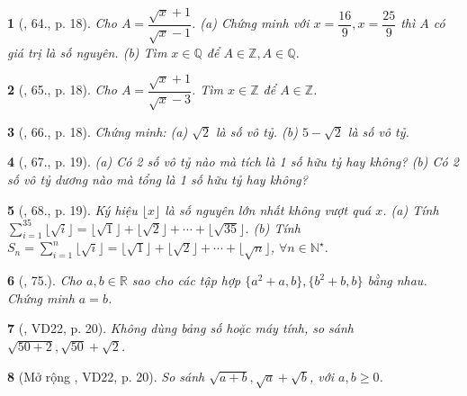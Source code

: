 \documentclass{article}
\newtheorem{baitoan}{}
\begin{document}
\begin{baitoan}[\cite{Binh_Toan_7_tap_1}, 64., p. 18]
	Cho $A = \dfrac{\sqrt{x} + 1}{\sqrt{x} - 1}$. (a) Chứng minh với $x = \dfrac{16}{9},x = \dfrac{25}{9}$ thì $A$ có giá trị là số nguyên. (b) Tìm $x\in\mathbb{Q}$ để $A\in\mathbb{Z},A\in\mathbb{Q}$.
\end{baitoan}

\begin{baitoan}[\cite{Binh_Toan_7_tap_1}, 65., p. 18]
	Cho $A = \dfrac{\sqrt{x} + 1}{\sqrt{x} - 3}$. Tìm $x\in\mathbb{Z}$ để $A\in\mathbb{Z}$.
\end{baitoan}

\begin{baitoan}[\cite{Binh_Toan_7_tap_1}, 66., p. 18]
	Chứng minh: (a) $\sqrt{2}$ là số vô tỷ. (b) $5 - \sqrt{2}$ là số vô tỷ.	
\end{baitoan}

\begin{baitoan}[\cite{Binh_Toan_7_tap_1}, 67., p. 19]
	(a) Có 2 số vô tỷ nào mà tích là 1 số hữu tỷ hay không? (b) Có 2 số vô tỷ dương nào mà tổng là 1 số hữu tỷ hay không?	
\end{baitoan}

\begin{baitoan}[\cite{Binh_Toan_7_tap_1}, 68., p. 19]
	Ký hiệu $\lfloor x\rfloor$ là số nguyên lớn nhất không vượt quá $x$. (a) Tính $\sum_{i=1}^{35} \lfloor\sqrt{i}\rfloor = \lfloor\sqrt{1}\rfloor + \lfloor\sqrt{2}\rfloor + \cdots + \lfloor\sqrt{35}\rfloor$. (b) Tính $S_n = \sum_{i=1}^n \lfloor\sqrt{i}\rfloor = \lfloor\sqrt{1}\rfloor + \lfloor\sqrt{2}\rfloor + \cdots + \lfloor\sqrt{n}\rfloor$, $\forall n\in\mathbb{N}^\star$.
\end{baitoan}

\begin{baitoan}[\cite{Binh_Toan_7_tap_1}, 75.]
	Cho $a,b\in\mathbb{R}$ sao cho các tập hợp $\{a^2 + a,b\},\{b^2 + b,b\}$ bằng nhau. Chứng minh $a = b$.
\end{baitoan}

\begin{baitoan}[\cite{Tuyen_Toan_7}, VD22, p. 20]
	Không dùng bảng số hoặc máy tính, so sánh $\sqrt{50 + 2},\sqrt{50} + \sqrt{2}$.
\end{baitoan}

\begin{baitoan}[Mở rộng \cite{Tuyen_Toan_7}, VD22, p. 20]
	So sánh $\sqrt{a + b},\sqrt{a} + \sqrt{b}$, với $a,b\ge 0$.
\end{baitoan}
\end{document}
